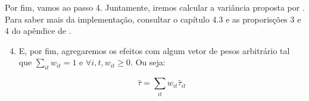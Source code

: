 \documentclass[portugues]{article}
\newenvironment{Shaded}{\begin{snugshade}}{\end{snugshade}}
\newcommand{\CommentTok}[1]{\textcolor[rgb]{0.56,0.35,0.01}{\textit{#1}}}
\newcommand{\DecValTok}[1]{\textcolor[rgb]{0.00,0.00,0.81}{#1}}
\newcommand{\NormalTok}[1]{#1}
\newcommand{\OtherTok}[1]{\textcolor[rgb]{0.56,0.35,0.01}{#1}}
\newcommand{\SpecialCharTok}[1]{\textcolor[rgb]{0.81,0.36,0.00}{\textbf{#1}}}
\newcommand{\StringTok}[1]{\textcolor[rgb]{0.31,0.60,0.02}{#1}}
\begin{document}
\begin{box_code}

\begin{Shaded}
\end{Shaded}

\end{box_code}

Por fim, vamos ao passo 4. Juntamente, iremos calcular a variância proposta por \cite{borusyak2024revisiting}. Para saber mais da implementação, consultar o capítulo 4.3 e as proporisções 3 e 4 do apêndice de \cite{borusyak2024revisiting}.

\begin{enumerate}
    \setcounter{enumi}{3}
     \item E, por fim, agregaremos os efeitos com algum vetor de pesos arbitrário tal que $\sum_{it} w_{it} = 1$ e $\forall i,t, w_{it} \geq 0$. Ou seja:

        $$ \hat{\tau} = \sum_{it} w_{it} \hat{\tau}_{it} $$
\end{enumerate}
\end{document}
